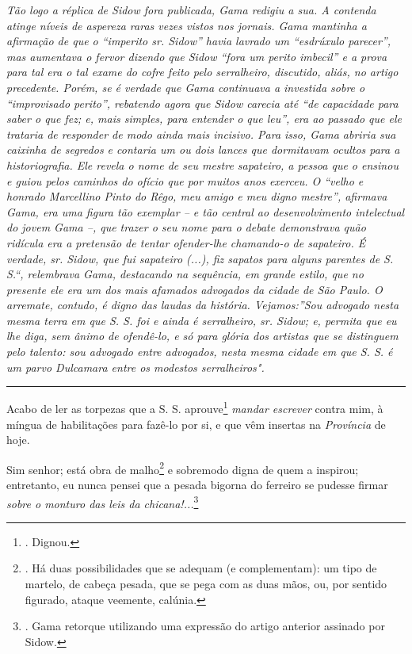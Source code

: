 \emph{Tão logo a réplica de Sidow fora publicada, Gama redigiu a sua. A
contenda atinge níveis de aspereza raras vezes vistos nos jornais. Gama
mantinha a afirmação de que o ``imperito sr. Sidow'' havia lavrado um
``esdrúxulo parecer'', mas aumentava o fervor dizendo que Sidow ``fora
um perito imbecil'' e a prova para tal era o tal exame do cofre feito
pelo serralheiro, discutido, aliás, no artigo precedente. Porém, se é
verdade que Gama continuava a investida sobre o ``improvisado perito'',
rebatendo agora que Sidow carecia até ``de capacidade para saber o que
fez; e, mais simples, para entender o que leu'', era ao passado que ele
trataria de responder de modo ainda mais incisivo. Para isso, Gama
abriria sua caixinha de segredos e contaria um ou dois lances que
dormitavam ocultos para a historiografia. Ele revela o nome de seu
mestre sapateiro, a pessoa que o ensinou e guiou pelos caminhos do
ofício que por muitos anos exerceu. O ``velho e honrado Marcellino Pinto
do Rêgo, meu amigo e meu digno mestre'', afirmava Gama, era uma figura
tão exemplar -- e tão central ao desenvolvimento intelectual do jovem
Gama --, que trazer o seu nome para o debate demonstrava quão ridícula
era a pretensão de tentar ofender-lhe chamando-o de sapateiro. É
verdade, sr. Sidow, que fui sapateiro (...), fiz sapatos para alguns
parentes de S. S.``, relembrava Gama, destacando na sequência, em grande
estilo, que no presente ele era um dos mais afamados advogados da cidade
de São Paulo. O arremate, contudo, é digno das laudas da história.
Vejamos:''Sou advogado nesta mesma terra em que S. S. foi e ainda é
serralheiro, sr. Sidow; e, permita que eu lhe diga, sem ânimo de
ofendê-lo, e só para glória dos artistas que se distinguem pelo talento:
sou advogado entre advogados, nesta mesma cidade em que S. S. é um parvo
Dulcamara entre os modestos serralheiros". }

\begin{center}\rule{0.5\linewidth}{\linethickness}\end{center}

Acabo de ler as torpezas que a S. S. aprouve\footnote{. Dignou.}
\emph{mandar escrever} contra mim, à míngua de habilitações para fazê-lo
por si, e que vêm insertas na \emph{Província} de hoje.

Sim senhor; está obra de malho\footnote{. Há duas possibilidades que se
  adequam (e complementam): um tipo de martelo, de cabeça pesada, que se
  pega com as duas mãos, ou, por sentido figurado, ataque veemente,
  calúnia.} e sobremodo digna de quem a inspirou; entretanto, eu nunca
pensei que a pesada bigorna do ferreiro se pudesse firmar \emph{sobre o
monturo das leis da chicana!...}\footnote{. Gama retorque utilizando uma
  expressão do artigo anterior assinado por Sidow.}

